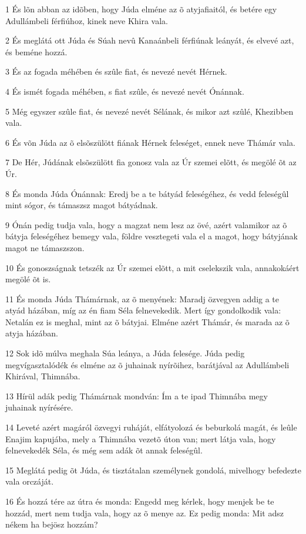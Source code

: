 \par 1 És lõn abban az idõben, hogy Júda elméne az õ atyjafiaitól, és betére egy Adullámbeli férfiúhoz, kinek neve Khira vala.
\par 2 És meglátá ott Júda és Súah nevû Kanaánbeli férfiúnak leányát, és elvevé azt, és beméne hozzá.
\par 3 És az fogada méhében és szûle fiat, és nevezé nevét Hérnek.
\par 4 És ismét fogada méhében, s fiat szûle, és nevezé nevét Ónánnak.
\par 5 Még egyszer szûle fiat, és nevezé nevét Sélának, és mikor azt szûlé, Khezibben vala.
\par 6 És võn Júda az õ elsõszülött fiának Hérnek feleséget, ennek neve Thámár vala.
\par 7 De Hér, Júdának elsõszülött fia gonosz vala az Úr szemei elõtt, és megölé õt az Úr.
\par 8 És monda Júda Ónánnak: Eredj be a te bátyád feleségéhez, és vedd feleségûl mint sógor, és támaszsz magot bátyádnak.
\par 9 Ónán pedig tudja vala, hogy a magzat nem lesz az övé, azért valamikor az õ bátyja feleségéhez bemegy vala, földre vesztegeti vala el a magot, hogy bátyjának magot ne támaszszon.
\par 10 És gonoszságnak tetszék az Úr szemei elõtt, a mit cselekszik vala, annakokáért megölé õt is.
\par 11 És monda Júda Thámárnak, az õ menyének: Maradj özvegyen addig a te atyád házában, míg az én fiam Séla felnevekedik. Mert így gondolkodik vala: Netalán ez is meghal, mint az õ bátyjai. Elméne azért Thámár, és marada az õ atyja házában.
\par 12 Sok idõ múlva meghala Súa leánya, a Júda felesége. Júda pedig megvígasztalódék és elméne az õ juhainak nyírõihez, barátjával az Adullámbeli Khirával, Thimnába.
\par 13 Hírül adák pedig Thámárnak mondván: Ím a te ipad Thimnába megy juhainak nyírésére.
\par 14 Leveté azért magáról özvegyi ruháját, elfátyolozá és beburkolá magát, és leûle Enajim kapujába, mely a Thimnába vezetõ úton van; mert látja vala, hogy felnevekedék Séla, és még sem adák õt annak feleségûl.
\par 15 Meglátá pedig õt Júda, és tisztátalan személynek gondolá, mivelhogy befedezte vala orczáját.
\par 16 És hozzá tére az útra és monda: Engedd meg kérlek, hogy menjek be te hozzád, mert nem tudja vala, hogy az õ menye az. Ez pedig monda: Mit adsz nékem ha bejösz hozzám?
